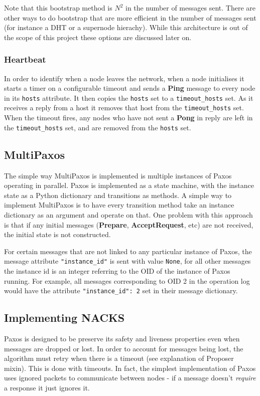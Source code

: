 \documentclass[12pt,twoside,notitlepage]{report}
\newcommand{\msg}[1] {{\bf #1}}         %
\begin{document}
Note that this bootstrap method is $N^2$ in the number of messages sent. There are other ways to
do bootstrap that are more efficient in the number of messages sent (for instance a DHT or a
supernode hierachy). While this architecture is out of the scope of this project these options are
discussed later on.

\subsubsection{Heartbeat}

In order to identify when a node leaves the network, when a node initialises it starts a timer on
a configurable timeout and sends a \msg{Ping} message to every node in its \verb+hosts+ attribute.
It then copies the \verb+hosts+ set to a \verb+timeout_hosts+ set. As it receives a reply from a
host it removes that host from the \verb+timeout_hosts+ set. When the timeout fires, any nodes who
have not sent a \msg{Pong} in reply are left in the \verb+timeout_hosts+ set, and are removed from
the \verb+hosts+ set.

\subsection{MultiPaxos}

The simple way MultiPaxos is implemented is multiple instances of Paxos operating in parallel.
Paxos is implemented as a state machine, with the instance state as a Python dictionary and
transitions as methods. A simple way to implement MultiPaxos is to have every transition method
take an instance dictionary as an argument and operate on that. One problem with this approach is
that if any initial messages (\msg{Prepare}, \msg{AcceptRequest}, etc) are not received, the
initial state is not constructed.

For certain messages that are not linked to any particular instance of Paxos, the message
attribute \verb+"instance_id"+ is sent with value \verb+None+, for all other messages the instance
id is an integer referring to the OID of the instance of Paxos running. For example, all messages
corresponding to OID 2 in the operation log would have the attribute \verb+"instance_id": 2+ set
in their message dictionary.

\subsection{Implementing NACKS}

Paxos is designed to be preserve its safety and liveness properties even when messages are dropped
or lost. In order to account for messages being lost, the algorithm must retry when there is a
timeout (see explanation of Proposer mixin). This is done with timeouts. In fact, the simplest
implementation of Paxos uses ignored packets to communicate between nodes - if a message doesn't
\emph{require} a response it just ignores it.
\end{document}
